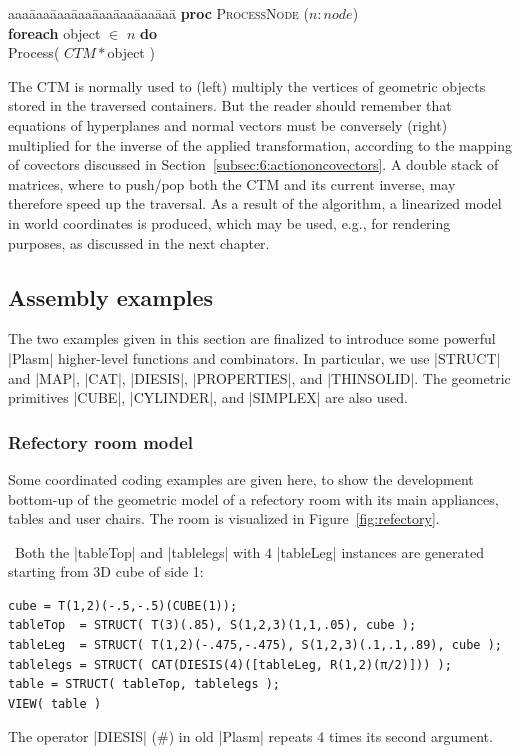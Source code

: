 \begin{coding}
\begin{script}
\begin{tabbing}
aaa\=aaa\=aaa\=aaa\=aaa\=aaa\=aaa\=aaa\=\kill
{\bf proc} \textsc{ProcessNode} ($n: node$) \+\\ 
  \textbf{foreach} object $\in$ $n$ \textbf{do} \+\\
    Process( $CTM * $object )
\end{tabbing}
\end{script}

\vspace{5mm}
The CTM is normally used to (left) multiply the vertices of geometric
objects stored in the traversed containers.  But the reader should
remember that equations of hyperplanes and normal vectors must be
conversely (right) multiplied for the inverse of the applied
transformation, according to the mapping of covectors discussed in
Section~\ref{subsec:6:actiononcovectors}.  A double stack of matrices,
where to push/pop both the CTM and its current inverse, may therefore
speed up the traversal.  As a result of the algorithm, a linearized model
in world coordinates is produced, which may be used, e.g., for rendering
purposes, as discussed in the next chapter.



\subsection*{Assembly examples}\label{sect:4-3-4}

The two examples given in this section are finalized to introduce some powerful |Plasm| higher-level functions and combinators. In particular, we use |STRUCT| and |MAP|, |CAT|, |DIESIS|, |PROPERTIES|, and |THINSOLID|. The geometric primitives |CUBE|, |CYLINDER|, and |SIMPLEX| are also used.

\subsubsection*{Refectory room model}\label{sect:4-3-4-1}

Some coordinated coding examples are given here, to show the development bottom-up of the geometric model of a refectory room with its main appliances, tables and user chairs. The room is visualized in Figure~\ref{fig:refectory}.

\begin{coding}[Table]\ 
Both the |tableTop| and |tablelegs| with $4$ |tableLeg| instances are generated starting from 3D cube of side 1:
\begin{lstlisting}[language=JuliaLocal, style=julia, mathescape=true]
cube = T(1,2)(-.5,-.5)(CUBE(1));
tableTop  = STRUCT( T(3)(.85), S(1,2,3)(1,1,.05), cube );
tableLeg  = STRUCT( T(1,2)(-.475,-.475), S(1,2,3)(.1,.1,.89), cube );
tablelegs = STRUCT( CAT(DIESIS(4)([tableLeg, R(1,2)(π/2)])) );
table = STRUCT( tableTop, tablelegs );
VIEW( table )
\end{lstlisting}
The operator |DIESIS| ($\#$) in old |Plasm| repeats 4 times its second argument.
\end{coding}


\end{coding}
